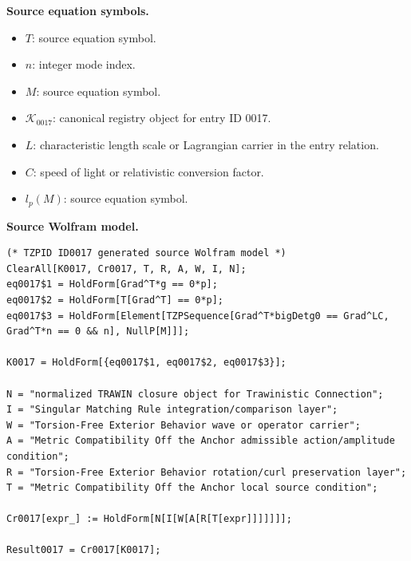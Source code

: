 \begin{minipage}[t]{0.49\linewidth}
\begingroup
\small
\raggedright
\textbf{Source equation symbols.}\par
\begin{itemize}[leftmargin=1.35em,itemsep=1pt,topsep=1pt,parsep=0pt]
    \item $T$: source equation symbol.
    \item $n$: integer mode index.
    \item $M$: source equation symbol.
    \item $\mathcal{K}_{0017}$: canonical registry object for entry ID 0017.
    \item $L$: characteristic length scale or Lagrangian carrier in the entry relation.
    \item $C$: speed of light or relativistic conversion factor.
    \item $l_{p}(M)$: source equation symbol.
\end{itemize}
\endgroup
\end{minipage}\hfill
\begin{minipage}[t]{0.47\linewidth}
\begingroup
\scriptsize
\raggedright
\textbf{Source Wolfram model.}\par
\begin{Verbatim}[fontsize=\tiny,breaklines=true,breakanywhere=true]
(* TZPID ID0017 generated source Wolfram model *)
ClearAll[K0017, Cr0017, T, R, A, W, I, N];
eq0017$1 = HoldForm[Grad^T*g == 0*p];
eq0017$2 = HoldForm[T[Grad^T] == 0*p];
eq0017$3 = HoldForm[Element[TZPSequence[Grad^T*bigDetg0 == Grad^LC, Grad^T*n == 0 && n], NullP[M]]];

K0017 = HoldForm[{eq0017$1, eq0017$2, eq0017$3}];

N = "normalized TRAWIN closure object for Trawinistic Connection";
I = "Singular Matching Rule integration/comparison layer";
W = "Torsion-Free Exterior Behavior wave or operator carrier";
A = "Metric Compatibility Off the Anchor admissible action/amplitude condition";
R = "Torsion-Free Exterior Behavior rotation/curl preservation layer";
T = "Metric Compatibility Off the Anchor local source condition";

Cr0017[expr_] := HoldForm[N[I[W[A[R[T[expr]]]]]]];

Result0017 = Cr0017[K0017];
\end{Verbatim}
\endgroup
\end{minipage}

